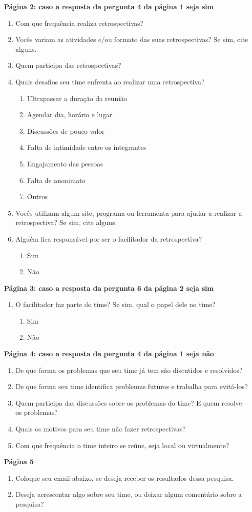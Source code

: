 \textbf{Página 2: caso a resposta da pergunta 4 da página 1 seja sim}
\begin{enumerate}
	\item Com que frequência realiza retrospectivas?
	\item Vocês variam as atividades e/ou formato das suas retrospectivas? Se sim, cite alguns.
	\item Quem participa das retrospectivas?
	\item Quais desafios seu time enfrenta ao realizar uma retrospectiva? 
	\begin{enumerate}
		\item Ultrapassar a duração da reunião
		\item Agendar dia, horário e lugar
		\item Discussões de pouco valor 
		\item Falta de intimidade entre os integrantes 
		\item Engajamento das pessoas 
		\item Falta de anonimato 
		\item Outros 
	\end{enumerate}
	\item Vocês utilizam algum site, programa ou ferramenta para ajudar a realizar a retrospectiva? Se sim, cite alguns. 
	\item Alguém fica responsável por ser o facilitador da retrospectiva?
	\begin{enumerate}
		\item Sim 
		\item Não
	\end{enumerate}
\end{enumerate}

\textbf{Página 3: caso a resposta da pergunta 6 da página 2 seja sim}
\begin{enumerate}
	\item O facilitador faz parte do time? Se sim, qual o papel dele no time?
	\begin{enumerate}
		\item Sim
		\item Não
	\end{enumerate}
\end{enumerate}

\textbf{Página 4: caso a resposta da pergunta 4 da página 1 seja não}
\begin{enumerate}
	\item De que forma os problemas que seu time já tem são discutidos e resolvidos? 
	\item De que forma seu time identifica problemas futuros e trabalha para evitá-los? 
	\item Quem participa das discussões sobre os problemas do time? E quem resolve os problemas? 
	\item Quais os motivos para seu time não fazer retrospectivas? 
	\item Com que frequência o time inteiro se reúne, seja local ou virtualmente?
\end{enumerate}

\textbf{Página 5}
\begin{enumerate}
	\item Coloque seu email abaixo, se deseja receber os resultados dessa pesquisa. 
	\item Deseja acrescentar algo sobre seu time, ou deixar algum comentário sobre a pesquisa?
\end{enumerate}